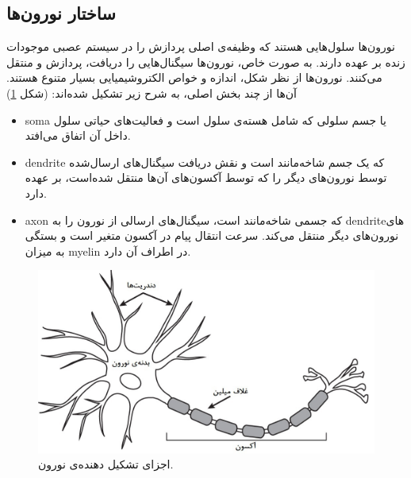 \documentclass[12pt]{report}
\begin{document}
	\subsection{ساختار نورون‌ها}
	
	نورون‌ها سلول‌هایی هستند که وظیفه‌ی اصلی پردازش را در سیستم عصبی موجودات زنده بر عهده دارند. به صورت خاص، نورون‌ها سیگنال‌هایی را دریافت، پردازش و منتقل می‌کنند. نورون‌ها از نظر شکل، اندازه و خواص الکتروشیمیایی بسیار متنوع هستند. آن‌ها از چند بخش اصلی، به شرح زیر تشکیل شده‌اند: (شکل \ref{fig:neuron})
	\begin{itemize}
		\item \gls{soma} یا جسم سلولی که شامل هسته‌ی سلول است و فعالیت‌های حیاتی سلول داخل آن اتفاق می‌افتد.
		\item \gls{dendrite} که یک جسم شاخه‌مانند است و نقش دریافت سیگنال‌های ارسال‌شده توسط نورون‌های دیگر را که توسط آکسون‌های آن‌ها منتقل شده‌است، بر عهده دارد.
		\item \gls{axon} که جسمی شاخه‌مانند است، سیگنال‌های ارسالی از نورون را به \gls{dendrite}‌های نورون‌های دیگر منتقل می‌کند. سرعت انتقال پیام‌‌ در آکسون متغیر است و بستگی به میزان \gls{myelin} در اطراف آن دارد.
	\end{itemize}
	
	\begin{figure}[]
		\centering
		\includegraphics[width=0.7\linewidth]{neuron.jpg}
		\caption[NS]{
			اجزای تشکیل دهنده‌ی نورون\footnotemark.
		}
		\label{fig:neuron}
	\end{figure}
	
	
\end{document}
